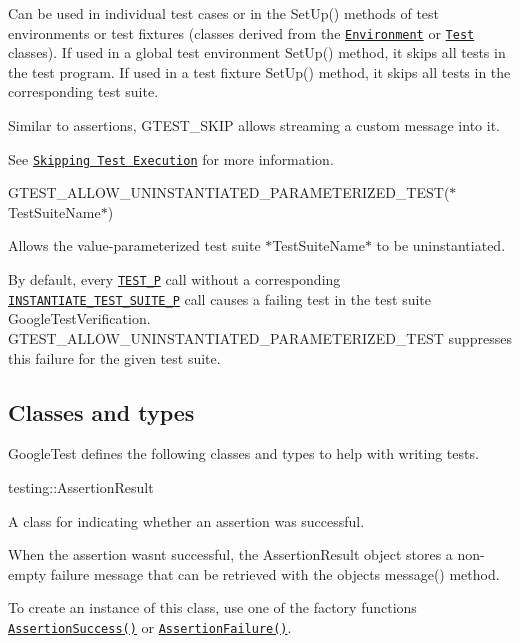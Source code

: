 Can be used in individual test cases or in the {\ttfamily Set\+Up()} methods of test environments or test fixtures (classes derived from the \href{#Environment}{\tt {\ttfamily Environment}} or \href{#Test}{\tt {\ttfamily Test}} classes). If used in a global test environment {\ttfamily Set\+Up()} method, it skips all tests in the test program. If used in a test fixture {\ttfamily Set\+Up()} method, it skips all tests in the corresponding test suite.

Similar to assertions, {\ttfamily G\+T\+E\+S\+T\+\_\+\+S\+K\+IP} allows streaming a custom message into it.

See \href{../advanced.md#skipping-test-execution}{\tt Skipping Test Execution} for more information.

{\ttfamily G\+T\+E\+S\+T\+\_\+\+A\+L\+L\+O\+W\+\_\+\+U\+N\+I\+N\+S\+T\+A\+N\+T\+I\+A\+T\+E\+D\+\_\+\+P\+A\+R\+A\+M\+E\+T\+E\+R\+I\+Z\+E\+D\+\_\+\+T\+E\+ST(}$\ast${\ttfamily Test\+Suite\+Name}$\ast${\ttfamily )}

Allows the value-\/parameterized test suite $\ast${\ttfamily Test\+Suite\+Name}$\ast$ to be uninstantiated.

By default, every \href{#TEST_P}{\tt {\ttfamily T\+E\+S\+T\+\_\+P}} call without a corresponding \href{#INSTANTIATE_TEST_SUITE_P}{\tt {\ttfamily I\+N\+S\+T\+A\+N\+T\+I\+A\+T\+E\+\_\+\+T\+E\+S\+T\+\_\+\+S\+U\+I\+T\+E\+\_\+P}} call causes a failing test in the test suite {\ttfamily Google\+Test\+Verification}. {\ttfamily G\+T\+E\+S\+T\+\_\+\+A\+L\+L\+O\+W\+\_\+\+U\+N\+I\+N\+S\+T\+A\+N\+T\+I\+A\+T\+E\+D\+\_\+\+P\+A\+R\+A\+M\+E\+T\+E\+R\+I\+Z\+E\+D\+\_\+\+T\+E\+ST} suppresses this failure for the given test suite.

\subsection*{Classes and types}

Google\+Test defines the following classes and types to help with writing tests.

{\ttfamily testing\+::\+Assertion\+Result}

A class for indicating whether an assertion was successful.

When the assertion wasn\textquotesingle{}t successful, the {\ttfamily Assertion\+Result} object stores a non-\/empty failure message that can be retrieved with the object\textquotesingle{}s {\ttfamily message()} method.

To create an instance of this class, use one of the factory functions \href{#AssertionSuccess}{\tt {\ttfamily Assertion\+Success()}} or \href{#AssertionFailure}{\tt {\ttfamily Assertion\+Failure()}}.

